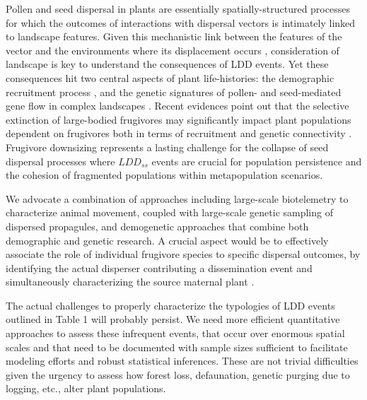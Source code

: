 \documentclass[a4paper, 12pt]{article}
\begin{document}
\begin{linenumbers}
Pollen and seed dispersal in plants are essentially spatially-structured processes for which the outcomes of interactions with dispersal vectors is intimately linked to landscape features. Given this mechanistic link between the features of the vector and the environments where its displacement occurs \citep{Nathan:2008fx}, consideration of landscape is key to understand the consequences of LDD events. Yet these consequences hit two central aspects of plant life-histories: the demographic recruitment process \citep{Harper:1977aa}, and the genetic signatures of pollen- and seed-mediated gene flow in complex landscapes \citep{Sork:1999}. Recent evidences point out that the selective extinction of large-bodied frugivores may significantly impact plant populations dependent on frugivores both in terms  of recruitment \citep{Traveset:2012he,PerezMendez:2015hya} and genetic connectivity \citep{Perez-Mendez:2016dz}. Frugivore downsizing represents a lasting challenge for the collapse of seed dispersal processes where $LDD_{ss}$ events are crucial for population persistence and the cohesion of fragmented populations within metapopulation scenarios.

We advocate \citep[also see ][]{Jordano:2002tr,Nathan:2003qe,Jones:2008il,Hardesty:2011jn} a combination of approaches including large-scale biotelemetry to characterize animal movement, coupled with large-scale genetic sampling of dispersed propagules, and demogenetic approaches that combine both demographic and genetic research. A crucial aspect would be to effectively associate the role of individual frugivore species to specific dispersal outcomes, by identifying the actual disperser contributing a dissemination event \citep{GonzalezVaro:2014ij} and simultaneously characterizing the source maternal plant \citep{Jordano:2002tr}.

The actual challenges to properly characterize the typologies of LDD events outlined in Table 1 will probably persist. We need more efficient quantitative approaches to assess these infrequent events, that occur over enormous spatial scales and that need to be documented with sample sizes sufficient to facilitate modeling efforts and robust statistical inferences. These are not trivial difficulties given the urgency to assess how forest loss, defaunation, genetic purging due to logging, etc., alter plant populations. 




\newpage


\end{linenumbers}
\end{document}
